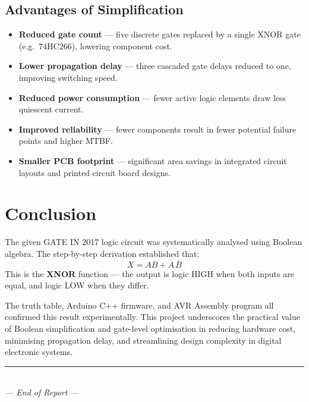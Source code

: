 \documentclass[12pt,a4paper]{article}
\begin{document}
\subsection{Advantages of Simplification}

\begin{itemize}[leftmargin=*, itemsep=4pt,
    label=\textcolor{accentblue}{$\blacktriangleright$}]
    \item \textbf{Reduced gate count} --- five discrete gates replaced by a
          single XNOR gate (e.g.\ 74HC266), lowering component cost.
    \item \textbf{Lower propagation delay} --- three cascaded gate delays
          reduced to one, improving switching speed.
    \item \textbf{Reduced power consumption} --- fewer active logic elements
          draw less quiescent current.
    \item \textbf{Improved reliability} --- fewer components result in fewer
          potential failure points and higher MTBF.
    \item \textbf{Smaller PCB footprint} --- significant area savings in
          integrated circuit layouts and printed circuit board designs.
\end{itemize}

\section{Conclusion}

The given GATE IN 2017 logic circuit was systematically analysed using Boolean
algebra. The step-by-step derivation established that:
\[
X = AB + \overline{A}\,\overline{B}
\]
This is the \textbf{XNOR} function --- the output is logic HIGH when both inputs
are equal, and logic LOW when they differ.

The truth table, Arduino C++ firmware, and AVR Assembly program all confirmed
this result experimentally. This project underscores the practical value of
Boolean simplification and gate-level optimisation in reducing hardware cost,
minimising propagation delay, and streamlining design complexity in digital
electronic systems.

\vfill
\begin{center}
\textcolor{accentblue}{\rule{0.6\linewidth}{0.8pt}}\\[4pt]
\textit{--- End of Report ---}
\end{center}
\end{document}
